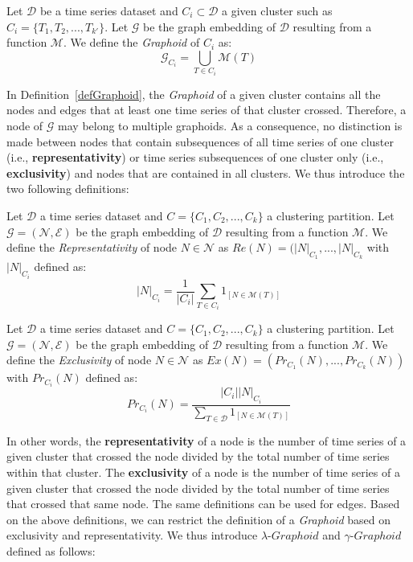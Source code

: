 \begin{definition}[$Graphoid$]   
Let $\mathcal{D}$ be a time series dataset and $C_i \subset \mathcal{D}$ a given cluster such as $C_i = \{T_1,T_2,...,T_{k'}\}$. Let $\mathcal{G}$ be the graph embedding of $\mathcal{D}$ resulting from a function $\mathcal{M}$. We define the {\it Graphoid} of $C_i$ as:
{\small
\[
\mathcal{G}_{C_i} = \bigcup_{T \in C_i} \mathcal{M}(T)
\]
}
\label{defGraphoid}  
\end{definition}

In Definition~\ref{defGraphoid}, the {\it Graphoid} of a given cluster contains all the nodes and edges that at least one time series of that cluster crossed. Therefore, a node of $\mathcal{G}$ may belong to multiple graphoids. As a consequence, no distinction is made between nodes that contain subsequences of all time series of one cluster (i.e., {\bf representativity}) or time series subsequences of one cluster only (i.e., {\bf exclusivity}) and nodes that are contained in all clusters. We thus introduce the two following definitions:

\begin{definition}   
Let $\mathcal{D}$ a time series dataset and $C = \{C_1,C_2,...,C_k\}$ a clustering partition. Let $\mathcal{G}=(\mathcal{N},\mathcal{E})$ be the graph embedding of $\mathcal{D}$ resulting from a function $\mathcal{M}$. We define the {\it Representativity} of node $N \in \mathcal{N}$ as $Re(N) = (|N|_{C_1}, ..., |N|_{C_k}$ with $|N|_{C_i}$ defined as:
{\small
\[
|N|_{C_i} = \frac{1}{{|C_i|}}\sum_{T \in C_i} 1_{[N \in \mathcal{M}(T)]}
\]
}
\label{defnodeRep}  
\end{definition}

\begin{definition}   
Let $\mathcal{D}$ a time series dataset and $C = \{C_1,C_2,...,C_k\}$ a clustering partition. Let $\mathcal{G}=(\mathcal{N},\mathcal{E})$ be the graph embedding of $\mathcal{D}$ resulting from a function $\mathcal{M}$. We define the {\it Exclusivity} of node $N \in \mathcal{N}$ as $Ex(N) = (Pr_{C_1}(N), ..., Pr_{C_k}(N))$ with $Pr_{C_i}(N)$ defined as:
{\small
\[
Pr_{C_i}(N) = \frac{|C_i||N|_{C_i}}{\sum_{T \in \mathcal{D}} 1_{[N \in \mathcal{M}(T)]}}
\]
}
\label{defnodeEx}  
\end{definition}

In other words, the {\bf representativity} of a node is the number of time series of a given cluster that crossed the node divided by the total number of time series within that cluster. 
The {\bf exclusivity} of a node is the number of time series of a given cluster that crossed the node divided by the total number of time series that crossed that same node. The same definitions can be used for edges. 
Based on the above definitions, we can restrict the definition of a {\it Graphoid} based on exclusivity and representativity. 
We thus introduce $\lambda$-$Graphoid$ and $\gamma$-$Graphoid$ defined as follows:

